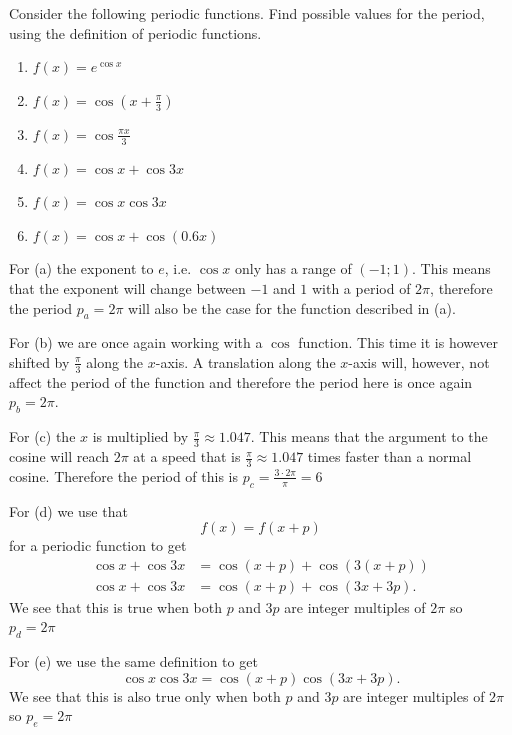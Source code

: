 
Consider the following periodic functions. Find possible values for the period, using the definition of periodic functions.

\begin{enumerate}[label=(\alph*)]
  \item $f(x) = e^{\cos x}$
  \item $f(x) = \cos \left( x + \frac{\pi}{3} \right)$
  \item $f(x) = \cos \frac{\pi x}{3}$
  \item $f(x) = \cos x + \cos 3x$
  \item $f(x) = \cos x \cos 3x$
  \item $f(x) = \cos x + \cos \left( \num{0,6} x \right)$
\end{enumerate}

For (a) the exponent to $e$, i.e. $\cos x$ only has a range of $(-1; 1)$. This means that the exponent will change between $-1$ and $1$ with a period of $2\pi$, therefore the period $p_a = 2\pi$ will also be the case for the function described in (a).

For (b) we are once again working with a $\cos$ function. This time it is however shifted by $\frac{\pi}{3}$ along the $x$-axis. A translation along the $x$-axis will, however, not affect the period of the function and therefore the period here is once again $p_b = 2\pi$.

For (c) the $x$ is multiplied by $\frac{\pi}{3} \approx \num{1,047}$. This means that the argument to the cosine will reach $2\pi$ at a speed that is $\frac{\pi}{3} \approx \num{1,047}$ times faster than a normal cosine. Therefore the period of this is $p_c = \frac{3 \cdot  2\pi}{\pi} = 6$

For (d) we use that
\[ 
f(x) = f(x + p)
\]
for a periodic function to get
\begin{align*}
  \cos x + \cos 3x &= \cos \left( x + p \right) + \cos \left( 3 \left( x + p \right) \right) \\
  \cos x + \cos 3x &= \cos (x + p) + \cos \left( 3x + 3p \right)
.\end{align*}
We see that this is true when both $p$ and $3p$ are integer multiples of $2\pi$ so $p_d = 2\pi$


For (e) we use the same definition to get
\[
  \cos x \cos 3x = \cos \left( x+p \right) \cos \left( 3x + 3p \right)
.\]
We see that this is also true only when both $p$ and $3p$ are integer multiples of $2\pi$ so $p_e = 2\pi$


